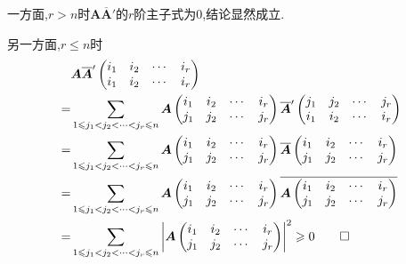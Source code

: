 \begin{Proof}
一方面,$r>n$时$\bm{A}\overline{\bm{A}}'$的$r$阶主子式为$0$,结论显然成立.

另一方面,$r\leqslant n$时
\begin{align*}
    &\bm{A}\overline{\bm{A}}'\begin{pmatrix}
        i_1&i_2&\cdots&i_r\\
        i_1&i_2&\cdots&i_r
    \end{pmatrix}\\
    =&
    \sum_{
        1\leqslant j_1<j_2<\cdots<j_r\leqslant n
    }\bm{A}\begin{pmatrix}
        i_1&i_2&\cdots&i_r\\
        j_1&j_2&\cdots&j_r
    \end{pmatrix}
    \overline{\bm{A}}'\begin{pmatrix}
        j_1&j_2&\cdots&j_r\\
        i_1&i_2&\cdots&i_r
    \end{pmatrix}\\
    =&\sum_{
        1\leqslant j_1<j_2<\cdots<j_r\leqslant n
    }\bm{A}\begin{pmatrix}
        i_1&i_2&\cdots&i_r\\
        j_1&j_2&\cdots&j_r
    \end{pmatrix}
    \overline{\bm{A}}\begin{pmatrix}
        i_1&i_2&\cdots&i_r\\
        j_1&j_2&\cdots&j_r
    \end{pmatrix}\\
    =&\sum _{
        1\leqslant j_1<j_2<\cdots<j_r\leqslant n
    }\bm{A}\begin{pmatrix}
        i_1&i_2&\cdots&i_r\\
        j_1&j_2&\cdots&j_r
    \end{pmatrix}\overline{
          \bm{A}\begin{pmatrix}
                i_1&i_2&\cdots&i_r\\
                j_1&j_2&\cdots&j_r
            \end{pmatrix}   
    }\\
    =&\sum_{
        1\leqslant j_1<j_2<\cdots<j_r\leqslant n
    }\left|\bm{A}\begin{pmatrix}
        i_1&i_2&\cdots&i_r\\
        j_1&j_2&\cdots&j_r
    \end{pmatrix}\right|^2\geqslant 0\qedhere
\end{align*}
\end{Proof}
